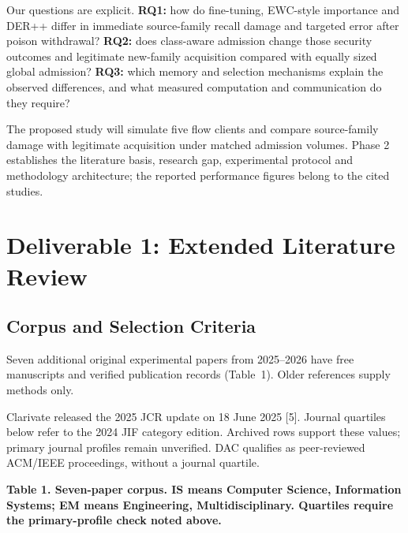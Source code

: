 \documentclass[10pt,a4paper]{article}
\begin{document}
Our questions are explicit. \textbf{RQ1:} how do fine-tuning, EWC-style importance and DER++ differ in immediate source-family recall damage and targeted error after poison withdrawal? \textbf{RQ2:} does class-aware admission change those security outcomes and legitimate new-family acquisition compared with equally sized global admission? \textbf{RQ3:} which memory and selection mechanisms explain the observed differences, and what measured computation and communication do they require?

The proposed study will simulate five flow clients and compare source-family damage with legitimate acquisition under matched admission volumes. Phase 2 establishes the literature basis, research gap, experimental protocol and methodology architecture; the reported performance figures belong to the cited studies.

\section{Deliverable 1: Extended Literature Review}
\subsection{Corpus and Selection Criteria}
Seven additional original experimental papers from 2025--2026 have free manuscripts and verified publication records (Table~1). Older references supply methods only.

Clarivate released the 2025 JCR update on 18 June 2025 [5]. Journal quartiles below refer to the 2024 JIF category edition. Archived rows support these values; primary journal profiles remain unverified. DAC qualifies as peer-reviewed ACM/IEEE proceedings, without a journal quartile.



\centering\footnotesize
\par\textbf{Table 1. Seven-paper corpus. IS means Computer Science, Information Systems; EM means Engineering, Multidisciplinary. Quartiles require the primary-profile check noted above.}\par
\end{document}
